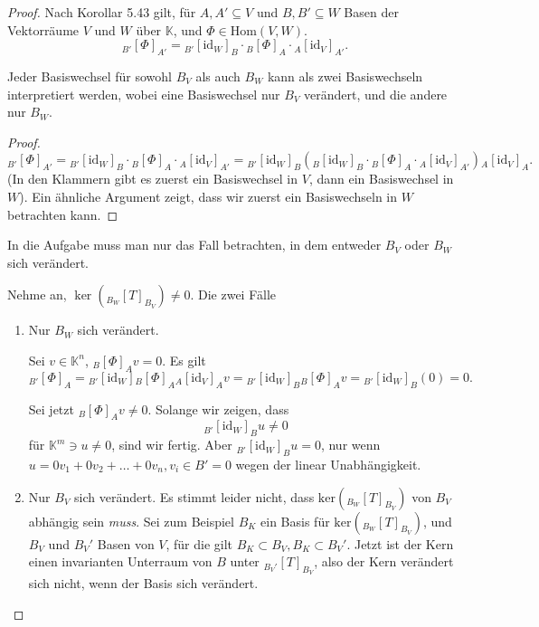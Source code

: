 \begin{proof}
Nach Korollar 5.43 gilt, f\"{u}r $A,A' \subseteq V$ und $B,B'\subseteq W$ Basen der Vektorräume $V$ und $W$ über $\mathbb{K}$, und $\Phi\in \text{Hom}(V,W)$.
 \[
	 _{B'}\left[ \Phi \right]_{A'}={}_{B'}[\text{id}_W]_B\cdot{}_B[\Phi]_A\cdot{}_A[\text{id}_V]_{A'}
.\] 
\begin{Lemma}
	Jeder Basiswechsel f\"{u}r sowohl $B_V$ als auch $B_W$ kann als zwei Basiswechseln interpretiert werden, wobei eine Basiswechsel nur $B_V$ verändert, und die andere nur $B_W$.
\end{Lemma}
\begin{proof}
	\[
		_{B'}\left[ \Phi \right]_{A'}={}_{B'}[\text{id}_W]_B\cdot{}_B[\Phi]_A\cdot{}_A[\text{id}_V]_{A'}={}_{B'}[\text{id}_W]_B\left( {}_B[\text{id}_W]_B\cdot {}_B[\Phi]_A\cdot {}_A[\text{id}_V]_{A'} \right) {}_A[\text{id}_V]_A
	.\]
	(In den Klammern gibt es zuerst ein Basiswechsel in $V$, dann ein Basiswechsel in $W$). Ein ähnliche Argument zeigt, dass wir zuerst ein Basiswechseln in $W$ betrachten kann.
\end{proof}
\begin{Corollary}
	In die Aufgabe muss man nur das Fall betrachten, in dem entweder $B_V$ oder $B_W$ sich verändert. 
\end{Corollary}
	\begin{parts}
	\item Nehme an, $\ker({}_{B_W}[T]_{B_V})\neq 0$. Die zwei Fälle
		\begin{enumerate}[label=(\roman*)]
			\item Nur $B_W$ sich verändert.

				Sei $v\in\mathbb{K}^n$, $_B[\Phi]_Av=0$. Es gilt
				\[
					_{B'}[\Phi]_A={}_{B'}[\text{id}_W]{}_B[\Phi]_A{}_A[\text{id}_V]_Av={}_{B'}[\text{id}_W]_B{}_B[\Phi]_Av={}_{B'}[\text{id}_W]_B(0)=0
				.\] 

				Sei jetzt $_B[\Phi]_Av\neq 0$. Solange wir zeigen, dass
				\[
					_{B'}[\text{id}_W]_B u\neq 0
				\]
				f\"{u}r $\mathbb{K}^m\ni u\neq 0$, sind wir fertig. Aber $_{B'}[\text{id}_W]_Bu=0$, nur wenn $u=0v_1+0v_2+\dots+0v_n, v_i\in B'=0$ wegen der linear Unabhängigkeit.

			\item Nur $B_V$ sich verändert. Es stimmt leider nicht, dass $\text{ker}({}_{B_W}[T]_{B_V})$ von $B_V$ abhängig sein \emph{muss}. Sei zum Beispiel $B_K$ ein Basis f\"{u}r $\text{ker}\left( {}_{B_W}[T]_{B_V} \right) $, und $B_V$ und $B_V'$ Basen von $V$, f\"{u}r die gilt $B_K\subset B_V, B_K\subset B_V'$. Jetzt ist der Kern einen invarianten Unterraum von $B$ unter $_{B_V'}[T]_{B_V}$, also der Kern verändert sich nicht, wenn der Basis sich verändert. 


\end{enumerate}
\end{parts}
\end{proof}
